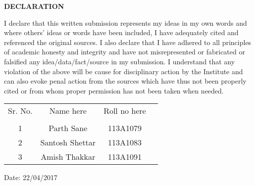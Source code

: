 \newpage
\thispagestyle{empty}

\begin{center}
\large {\textbf{DECLARATION}}\\[0.5cm]
\end{center}

\normalsize I declare that this written submission represents my ideas in my own words and where others’ ideas or words have been included, I have adequately cited and referenced the original sources. I also declare that I have adhered to all principles of academic honesty and integrity and have not misrepresented or fabricated or falsified any idea/data/fact/source in my submission. I understand that any violation of the above will be cause for disciplinary action by the Institute and can also evoke penal action from the sources which have thus not been properly cited or from whom proper permission has not been taken when needed.\\[1.0cm]

\begin{table}[h]
\centering
\begin{tabular}{c c c c}
Sr. No. & Name here &  Roll no here\\
\\
1 & Parth Sane &  113A1079 \\ 
2 & Santosh Shettar &  113A1083\\
3 & Amish Thakkar &  113A1091 \\
\end{tabular}
\end{table}

\vspace{2cm}

\normalsize Date: 22/04/2017
